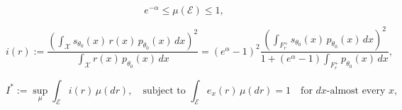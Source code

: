 \documentclass[10pt,a4paper]{amsart}
\begin{document}
\begin{equation}\label{eq: bound mu E}
    e^{-\alpha} \le \mu(\mathcal{E}) \le 1,
\end{equation}

\begin{equation}\label{eq : def i r ctn}
    i(r) := \frac{
        \left( \int_\mathcal{X} s_{\theta_0}(x) \, r(x) \, p_{\theta_0}(x) \, dx \right)^2
    }{
        \int_\mathcal{X} r(x) \, p_{\theta_0}(x) \, dx
    }
    = (e^\alpha - 1)^2
    \frac{
        \left( \int_{F_r^+} s_{\theta_0}(x) \, p_{\theta_0}(x) \, dx \right)^2
    }{
        1 + (e^\alpha - 1) \int_{F_r^+} p_{\theta_0}(x) \, dx
    },
\end{equation}

\begin{equation}\label{eq : optimisation pb ctn}
    I^* := \sup_{\mu}
    \int_\mathcal{E} i(r) \, \mu(dr),
    \quad
    \text{subject to } \int_\mathcal{E} e_x(r) \, \mu(dr) = 1
    \quad \text{for $dx$-almost every } x,
\end{equation}
\end{document}
